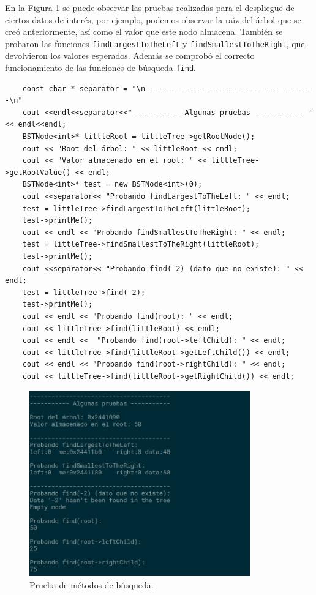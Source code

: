 En la Figura \ref{fig:2} se puede observar las pruebas realizadas para el despliegue de ciertos datos de interés, por ejemplo, podemos observar la raíz del árbol que se creó anteriormente, así como el valor que este nodo almacena. También se probaron las funciones \texttt{findLargestToTheLeft} y \texttt{findSmallestToTheRight}, que devolvieron los valores esperados. Además se comprobó el correcto funcionamiento de las funciones de búsqueda \texttt{find}.

\begin{verbatim}
    const char * separator = "\n---------------------------------------\n"
    cout <<endl<<separator<<"----------- Algunas pruebas ----------- " << endl<<endl;
    BSTNode<int>* littleRoot = littleTree->getRootNode();
    cout << "Root del árbol: " << littleRoot << endl;
    cout << "Valor almacenado en el root: " << littleTree->getRootValue() << endl;
    BSTNode<int>* test = new BSTNode<int>(0);
    cout <<separator<< "Probando findLargestToTheLeft: " << endl;
    test = littleTree->findLargestToTheLeft(littleRoot);
    test->printMe();
    cout << endl << "Probando findSmallestToTheRight: " << endl;
    test = littleTree->findSmallestToTheRight(littleRoot);
    test->printMe();
    cout <<separator<< "Probando find(-2) (dato que no existe): " << endl;
    test = littleTree->find(-2);
    test->printMe();
    cout << endl << "Probando find(root): " << endl;
    cout << littleTree->find(littleRoot) << endl;
    cout << endl <<  "Probando find(root->leftChild): " << endl;
    cout << littleTree->find(littleRoot->getLeftChild()) << endl;
    cout << endl << "Probando find(root->rightChild): " << endl;
    cout << littleTree->find(littleRoot->getRightChild()) << endl;
\end{verbatim}

\begin{figure}[H]
\centering
\includegraphics[width=0.85\textwidth]{imgs/Labo9/L9-2.png}
\caption{Prueba de métodos de búsqueda.}
\label{fig:2}
\end{figure}



